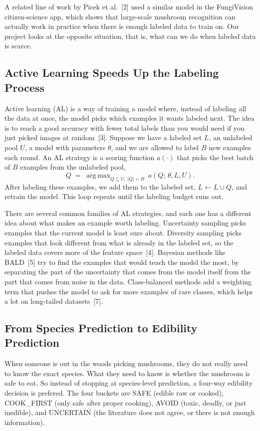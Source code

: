 \documentclass[11pt]{article}
\DeclareMathOperator*{\argmax}{arg\,max}
\begin{document}
A related line of work by Picek et al.~[2] used a similar model in the
FungiVision citizen-science app, which shows that large-scale mushroom
recognition can actually work in practice when there is enough labeled data
to train on. Our project looks at the opposite situation, that is,  what can we
do when labeled data is scarce.

\subsection{Active Learning Speeds Up the Labeling Process}

Active learning (AL) is a way of training a model where, instead of labeling
all the data at once, the model picks which examples it wants labeled next.
The idea is to reach a good accuracy with fewer total labels than you would
need if you just picked images at random~[3]. Suppose we have a labeled set
$L$, an unlabeled pool $U$, a model with parameters $\theta$, and we are
allowed to label $B$ new examples each round. An AL strategy is a scoring
function $a(\cdot)$ that picks the best batch of $B$ examples from the
unlabeled pool,
\[
Q \;=\; \argmax_{Q \subseteq U,\ |Q| = B}\ a(Q;\,\theta, L, U).
\]
After labeling these examples, we add them to the labeled set,
$L \leftarrow L \cup Q$, and retrain the model. This loop repeats until the
labeling budget runs out.

There are several common families of AL strategies, and each one has a
different idea about what makes an example worth labeling. Uncertainty
sampling picks examples that the current model is least sure about.
Diversity sampling picks examples that look different from what is already
in the labeled set, so the labeled data covers more of the feature
space~[4]. Bayesian methods like BALD~[5] try to find the examples that
would teach the model the most, by separating the part of the uncertainty
that comes from the model itself from the part that comes from noise in the
data. Class-balanced methods add a weighting term that pushes the model to
ask for more examples of rare classes, which helps a lot on long-tailed
datasets~[7].


\subsection{From Species Prediction to Edibility Prediction}

When someone is out in the woods picking mushrooms, they do not really need
to know the exact species. What they need to know is whether the mushroom is
safe to eat. So instead of stopping at species-level prediction, a four-way edibility decision is prefered. The four buckets are SAFE
(edible raw or cooked), COOK\_FIRST (only safe after proper cooking), AVOID
(toxic, deadly, or just inedible), and UNCERTAIN (the literature does not
agree, or there is not enough information).
\end{document}
